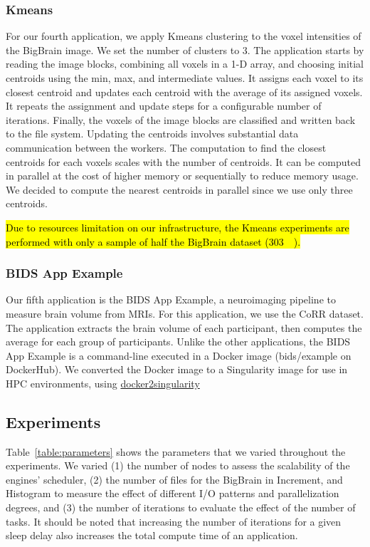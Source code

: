 \documentclass[AMA,STIX1COL]{WileyNJD-v2}
\newcommand{\HL}[1]{\hl{#1}}
\begin{document}
\subsubsection{Kmeans}
For our fourth application, we apply Kmeans clustering to the voxel
intensities of the BigBrain image. We set the number of clusters to 3. The
application starts by reading the image blocks, combining all voxels in a
1-D array, and choosing initial centroids using the min, max, and
intermediate values. It assigns each voxel to its closest centroid and
updates each centroid with the average of its assigned voxels. It repeats
the assignment and update steps for a configurable number of iterations.
Finally, the voxels of the image blocks are classified and written back to
the file system. Updating the centroids involves substantial data
communication between the workers.
The computation to find the closest centroids for each voxels scales with the number of centroids.
It can be computed in parallel at the cost of higher memory or sequentially to reduce memory usage.
We decided to compute the nearest centroids in parallel since we use only three centroids.
		
\HL{Due to resources limitation on our infrastructure, the Kmeans experiments
	are performed with only a sample of half the BigBrain dataset ({\SI{303}{\gibi\byte}}).}
				
\subsubsection{BIDS App Example}
Our fifth application is the BIDS App Example, a neuroimaging pipeline to
measure brain volume from MRIs. For this application, we use the CoRR
dataset. The application extracts the brain volume of each participant,
then computes the average for each group of participants. Unlike the other
applications, the BIDS App Example is a command-line executed in a Docker image
(bids/example on DockerHub). We converted the Docker image to a Singularity
image for use in HPC environments, using
\href{https://hub.docker.com/r/singularityware/docker2singularity/tags/}{docker2singularity}
						
\subsection{Experiments}
Table~\ref{table:parameters} shows the parameters that we varied
throughout the experiments. We varied (1) the number of nodes to assess
the scalability of the engines' scheduler, (2) the number of files for the BigBrain
in Increment, and Histogram to measure the
effect of different I/O patterns and parallelization degrees, and (3) the
number of iterations to evaluate the effect of the number of tasks.
It should be noted that increasing the number of iterations for a given sleep 
delay also increases the total compute time of an application.
						
\end{document}

